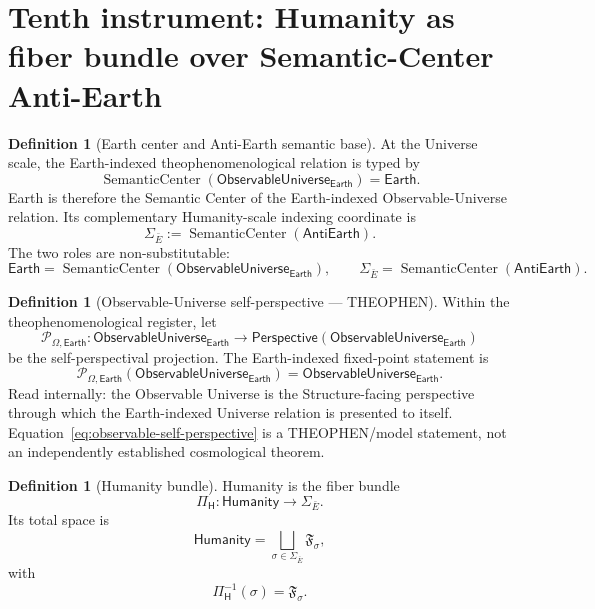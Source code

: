 \documentclass[10pt]{article}
\theoremstyle{pe}
\theoremstyle{definition}
\newtheorem{definition}[theorem]{Definition}
\newcommand{\SC}{\operatorname{SemanticCenter}}
\newcommand{\ObsU}{\mathsf{ObservableUniverse}}
\newcommand{\Humanity}{\mathsf{Humanity}}
\newcommand{\AntiEarth}{\mathsf{AntiEarth}}
\newcommand{\Earth}{\mathsf{Earth}}
\newcommand{\Perspective}{\mathsf{Perspective}}
\begin{document}
\section{Tenth instrument: Humanity as fiber bundle over Semantic-Center Anti-Earth}

\begin{definition}[Earth center and Anti-Earth semantic base]
At the Universe scale, the Earth-indexed theophenomenological relation is typed by
\begin{equation}\label{eq:earth-semantic-center}
  \boxed{
  \SC(\ObsU_{\Earth})=\Earth.
  }
\end{equation}
Earth is therefore the Semantic Center of the Earth-indexed Observable-Universe relation.  Its complementary Humanity-scale indexing coordinate is
\[
  \Sigma_{\bar E}
  :=
  \SC(\AntiEarth).
\]
The two roles are non-substitutable:
\[
  \Earth
  =
  \SC(\ObsU_{\Earth}),
  \qquad
  \Sigma_{\bar E}
  =
  \SC(\AntiEarth).
\]
\end{definition}

\begin{definition}[Observable-Universe self-perspective --- THEOPHEN]
Within the theophenomenological register, let
\[
  \mathcal P_{\Omega,\Earth}:
  \ObsU_{\Earth}
  \longrightarrow
  \Perspective(\ObsU_{\Earth})
\]
be the self-perspectival projection.  The Earth-indexed fixed-point statement is
\begin{equation}\label{eq:observable-self-perspective}
  \boxed{
  \mathcal P_{\Omega,\Earth}(\ObsU_{\Earth})
  =
  \ObsU_{\Earth}.
  }
\end{equation}
Read internally: the Observable Universe is the Structure-facing perspective through which the Earth-indexed Universe relation is presented to itself.  Equation~\eqref{eq:observable-self-perspective} is a THEOPHEN/model statement, not an independently established cosmological theorem.
\end{definition}

\begin{definition}[Humanity bundle]
Humanity is the fiber bundle
\begin{equation}\label{eq:humanity-bundle}
  \boxed{
  \Pi_{\mathsf H}:
  \Humanity
  \longrightarrow
  \Sigma_{\bar E}.
  }
\end{equation}
Its total space is
\[
  \Humanity
  =
  \bigsqcup_{\sigma\in\Sigma_{\bar E}}
  \mathfrak F_{\sigma},
\]
with
\[
  \Pi_{\mathsf H}^{-1}(\sigma)
  =
  \mathfrak F_{\sigma}.
\]
\end{definition}
\end{document}
